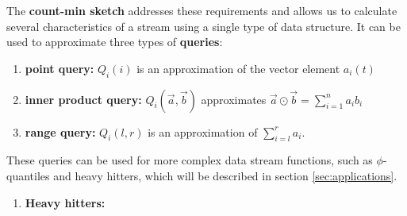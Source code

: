 \documentclass[11pt]{article}
\newcommand{\sq}{\mathit{Q}_i}
\begin{document}
The \textbf{count-min sketch} addresses these requirements and allows us to calculate several characteristics
of a stream using a single type of data structure.  It can be used to approximate three types of \textbf{queries}:
\begin{enumerate}
    \item \textbf{point query:} $\sq(i)$ is an approximation of the vector 
    element $a_i(t)$
    \item \textbf{inner product query:} $\sq(\vec{a}, \vec{b})$ approximates
    $\vec{a} \odot \vec{b} = \sum_{i = 1}^{n} a_i b_i$
    \item \textbf{range query:} $\sq(l, r)$ is an approximation of 
    $\sum_{i = l}^{r}a_i$. 
\end{enumerate}

These queries can be used for more complex data stream functions, such as $\phi$-quantiles and heavy hitters,
which will be described in section \ref{sec:applications}.

\begin{enumerate}
    \item \textbf{Heavy hitters:}
\end{enumerate}
\end{document}
